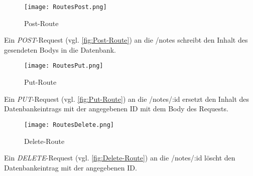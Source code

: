 \begin{center}
\begin{figure}[h!]
\centering
\texttt{[image: RoutesPost.png]}
\vspace{1pt}
\caption{Post-Route}
\label{fig:Post-Route}
\end{figure}
\end{center}

Ein \textit{POST}-Request (vgl. \autoref{fig:Post-Route}) an die \glqq /notes\grqq{} schreibt den Inhalt des gesendeten Bodys in die Datenbank.

\begin{center}
\begin{figure}[h!]
\centering
\texttt{[image: RoutesPut.png]}
\vspace{1pt}
\caption{Put-Route}
\label{fig:Put-Route}
\end{figure}
\end{center}

Ein \textit{PUT}-Request (vgl. \autoref{fig:Put-Route}) an die \glqq /notes/:id\grqq{} ersetzt den Inhalt des Datenbankeintrags mit der angegebenen ID mit dem Body des Requests.

\begin{center}
\begin{figure}[H]
\centering
\texttt{[image: RoutesDelete.png]}
\vspace{1pt}
\caption{Delete-Route}
\label{fig:Delete-Route}
\end{figure}
\end{center}
Ein \textit{DELETE}-Request (vgl. \autoref{fig:Delete-Route}) an die \glqq /notes/:id\grqq{} löscht den Datenbankeintrag mit der angegebenen ID.

